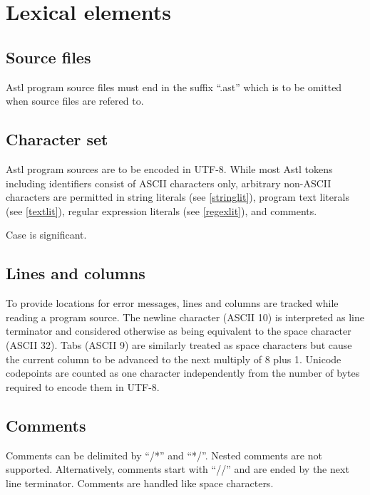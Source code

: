 \chapter{Lexical elements}

\section{Source files}

Astl program source files must end in the
suffix ``.ast'' which is to be omitted when
source files are refered to.

\section{Character set}

Astl program sources are to be encoded in UTF-8. While
most Astl tokens including identifiers consist of ASCII
characters only, arbitrary non-ASCII characters are permitted in
string literals (see \ref{stringlit}), program text literals (see
\ref{textlit}), regular expression literals (see \ref{regexlit}), and
comments.

Case is significant.

\section{Lines and columns}\label{lines}

To provide locations for error messages,
lines and columns are tracked while reading a
program source. The newline character
(ASCII 10) is interpreted as line terminator
and considered otherwise as being equivalent to the space
character (ASCII 32). Tabs (ASCII 9) are similarly treated as
space characters but cause the current column to be advanced to the next
multiply of 8 plus 1. Unicode codepoints are counted
as one character independently from the number of bytes required to encode
them in UTF-8.

\section{Comments}

Comments can be delimited by ``/*'' and ``*/''. Nested comments
are not supported. Alternatively, comments start with ``//'' and
are ended by the next line terminator.
Comments are handled like space characters.

